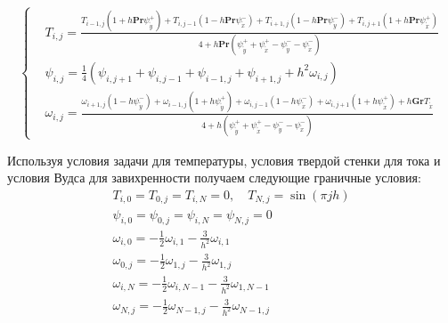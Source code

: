 \documentclass[a4paper, 12pt]{article}
\newcommand{\Pra}{\mathbf{Pr}}
\newcommand{\Gra}{\mathbf{Gr}}
\newcommand{\psp}[2]{\psi_{\mathring{#1}}^{#2}}
\begin{document}
    \begin{equation}
      \left\{
        \begin{aligned}
          &T_{i,j} =
            \frac{
              T_{i-1,j}\left(
                1 + h \Pra \psp{y}{+}
              \right) +
              T_{i,j-1}\left(
                1 - h \Pra \psp{x}{-}
              \right) +
              T_{i+1,j}\left(
                1 - h \Pra \psp{y}{-}
              \right) +
              T_{i,j+1}\left(
                1 + h \Pra \psp{x}{+}
              \right)
            }{4 + h \Pra \left(
              \psp{y}{+} + \psp{x}{+} - \psp{y}{-} - \psp{x}{-}
            \right)}
          \\
          &\psi_{i,j} = \frac{1}{4} \left(
            \psi_{i,j+1} + \psi_{i,j-1} + \psi_{i-1,j} + \psi_{i+1,j} +
            h^2 \omega_{i,j}
          \right)
          \\
          &\omega_{i,j} =
            \frac{
              \omega_{i+1, j} \left( 1 - h \psp{y}{-} \right) +
              \omega_{i-1, j} \left( 1 + h \psp{y}{+} \right) +
              \omega_{i, j-1} \left( 1 - h \psp{x}{-} \right) +
              \omega_{i, j+1} \left( 1 + h \psp{x}{+} \right) +
              h \Gra T_{\mathring{x}}
            }{4 + h \left(
              \psp{y}{+} + \psp{x}{+} - \psp{y}{-} - \psp{x}{-}
            \right)}
        \end{aligned}
      \right.
    \end{equation}
    
    Используя условия задачи для температуры, условия твердой стенки для тока и условия Вудса для завихренности 
    получаем следующие граничные условия:
    \begin{gather*}
      T_{i,0} = T_{0,j} = T_{i,N} = 0, \quad T_{N,j} = \sin (\pi j h)
      \\
      \psi_{i,0} = \psi_{0,j} = \psi_{i,N} = \psi_{N,j} = 0
      \\
      \omega_{i,0} = - \frac{1}{2} \omega_{i,1} - \frac{3}{h^2} \omega_{i,1}
      \\
      \omega_{0,j} = - \frac{1}{2} \omega_{1,j} - \frac{3}{h^2} \omega_{1,j}
      \\
      \omega_{i,N} = - \frac{1}{2} \omega_{i,N-1} - \frac{3}{h^2} \omega_{1,N-1}
      \\
      \omega_{N,j} = - \frac{1}{2} \omega_{N-1,j} - \frac{3}{h^2} \omega_{N-1,j}
      \\
    \end{gather*}
\end{document}
